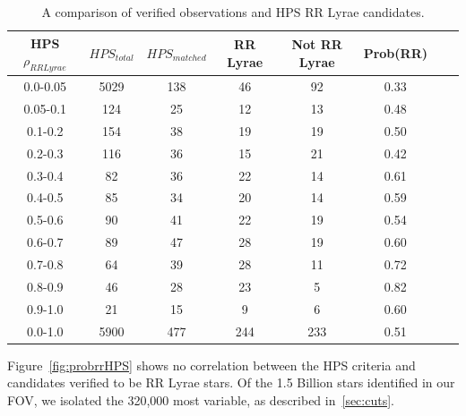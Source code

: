 \documentclass[aps,prb,twocolumn,superscriptaddress]{revtex4-1}
\begin{document}
\fi
\begin{table}
	\begin{center}
		\begin{tabular}{|c|c|c|c|c|c|c|c|}\hline
HPS $\rho_{RRLyrae}$ & $HPS_{total}$ & $HPS_{matched}$ & RR Lyrae & Not RR Lyrae & Prob(RR) \\ \hline
0.0-0.05 & 5029 & 138 & 46 		& 92 & 0.33 \\ \hline
0.05-0.1 & 124 & 25 & 12 		& 13 & 0.48 \\ \hline
0.1-0.2 & 154 & 38 & 19 		& 19 & 0.50 \\ \hline
0.2-0.3 & 116 & 36 & 15 		& 21 & 0.42 \\ \hline
0.3-0.4 & 82 & 36 & 22 			& 14 & 0.61 \\ \hline
0.4-0.5 & 85 & 34 & 20			& 14 & 0.59 \\ \hline
0.5-0.6 & 90 & 41 & 22			& 19 & 0.54 \\ \hline
0.6-0.7 & 89 & 47 & 28			& 19 & 0.60 \\ \hline
0.7-0.8 & 64 & 39 & 28 			& 11 & 0.72 \\ \hline
0.8-0.9 & 46 & 28 & 23 			& 5 & 0.82 \\ \hline
0.9-1.0 & 21 & 15 & 9			& 6 & 0.60 \\ \hline
\hline
0.0-1.0 & 5900 & 477 & 244 & 233 & 0.51 \\ \hline
		\end{tabular}
	\end{center}
\caption{ \small{A comparison of verified observations and HPS RR Lyrae candidates. \label{tab:HPSlim15}}}
\end{table}



Figure~\ref{fig:probrrHPS} shows no correlation between the HPS criteria and candidates verified to be RR Lyrae stars.  Of the 1.5 Billion stars identified in our FOV, we isolated the 320,000 most variable, 
as described in~\cref{sec:cuts}.


\end{document}
